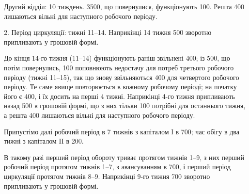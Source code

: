 Другий відділ: 10 тиждень. \num{3500}, що повернулися, функціонують
100. Решта 400 лишаються вільні для наступного
робочого періоду.

2. Період циркуляції: тижні 11--14. Наприкінці 14 тижня 500 зворотно припливають у грошовій формі.

До кінця 14-го тижня (11--14) функціонують раніш звільнені 400; із 500, що потім повернулись, 100 поповнюють
недостачу для потреб третього робочого періоду (тижні 11--15),
так що знову звільняються 400 для четвертого робочого періоду.
Те саме явище повторюється в кожному робочому періоді; на
початку його є 400, і їх досить на перші 4 тижні. Наприкінці
4-го тижня припливають назад 500 в грошовій формі, що з
них тільки 100 потрібні для останнього тижня, а решта 400 лишаються вільні для наступного робочого періоду.

Припустімо далі робочий період в 7 тижнів з капіталом І в 700; час обігу в два тижні з капіталом II в 200.

В такому разі перший період обороту триває протягом тижнів 1--9,
з них перший робочий період протягом тижнів 1--7, з авансуванням
в 700, і перший період циркуляції протягом тижнів 8--9. Наприкінці
9-го тижня 700 зворотно припливають у грошовій формі.
